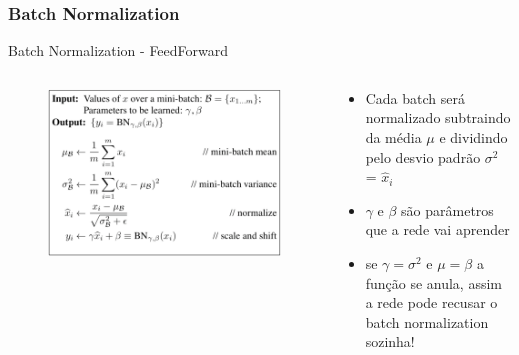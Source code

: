 \documentclass{beamer}
\begin{document}
\begin{frame}
	\frametitle{Batch Normalization}
	\begin{block}{Batch Normalization - FeedForward}
	\begin{columns}
		\begin{column}{0.5 \textwidth}
			\begin{figure}
				\centering
				\includegraphics[width=1\linewidth]{figures/batch_norm_feed.png}
			\end{figure}
		\end{column}
		\begin{column}{0.5 \textwidth}
			\begin{itemize}
				\item Cada batch será normalizado subtraindo da média $\mu$ e dividindo pelo desvio padrão $\sigma^2$ = $\hat{x}_i$
				\item $\gamma$ e $\beta$ são parâmetros que a rede vai aprender
				\item se $\gamma = \sigma^2 $ e $\mu = \beta$ a função se anula, assim a rede pode recusar o batch normalization sozinha!
			\end{itemize}
		\end{column}
	\end{columns}

	\end{block}
\end{frame}	
	
\end{document}
